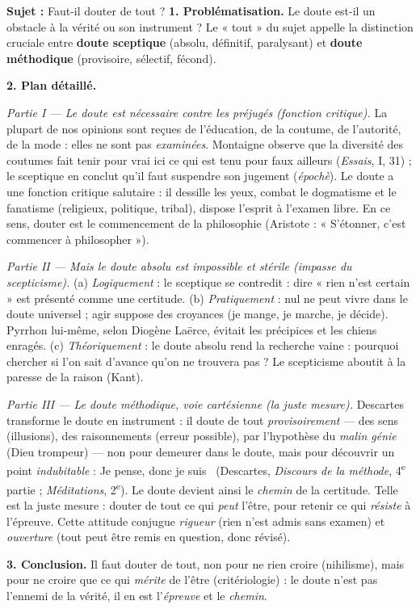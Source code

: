 \documentclass[11pt]{article}
\begin{document}
\begin{exoresolu}
\textbf{Sujet :} Faut-il douter de tout ?
\tcblower
\textbf{1. Problématisation.} Le doute est-il un obstacle à la vérité ou son instrument ? Le « tout » du sujet appelle la distinction cruciale entre \textbf{doute sceptique} (absolu, définitif, paralysant) et \textbf{doute méthodique} (provisoire, sélectif, fécond).

\textbf{2. Plan détaillé.}

\emph{Partie I — Le doute est nécessaire contre les préjugés (fonction critique).} La plupart de nos opinions sont reçues de l'éducation, de la coutume, de l'autorité, de la mode : elles ne sont pas \emph{examinées}. Montaigne observe que la diversité des coutumes fait tenir pour vrai ici ce qui est tenu pour faux ailleurs (\emph{Essais}, I, 31) ; le sceptique en conclut qu'il faut suspendre son jugement (\emph{épochè}). Le doute a une fonction critique salutaire : il dessille les yeux, combat le dogmatisme et le fanatisme (religieux, politique, tribal), dispose l'esprit à l'examen libre. En ce sens, douter est le commencement de la philosophie (Aristote : « S'étonner, c'est commencer à philosopher »).

\emph{Partie II — Mais le doute absolu est impossible et stérile (impasse du scepticisme).} (a) \emph{Logiquement} : le sceptique se contredit : dire « rien n'est certain » est présenté comme une certitude. (b) \emph{Pratiquement} : nul ne peut vivre dans le doute universel ; agir suppose des croyances (je mange, je marche, je décide). Pyrrhon lui-même, selon Diogène Laërce, évitait les précipices et les chiens enragés. (c) \emph{Théoriquement} : le doute absolu rend la recherche vaine : pourquoi chercher si l'on sait d'avance qu'on ne trouvera pas ? Le scepticisme aboutit à la paresse de la raison (Kant).

\emph{Partie III — Le doute méthodique, voie cartésienne (la juste mesure).} Descartes transforme le doute en instrument : il doute de tout \emph{provisoirement} — des sens (illusions), des raisonnements (erreur possible), par l'hypothèse du \emph{malin génie} (Dieu trompeur) — non pour demeurer dans le doute, mais pour découvrir un point \emph{indubitable} : \guillemotleft Je pense, donc je suis \guillemotright\ (Descartes, \emph{Discours de la méthode}, 4\textsuperscript{e} partie ; \emph{Méditations}, 2\textsuperscript{e}). Le doute devient ainsi le \emph{chemin} de la certitude. Telle est la juste mesure : douter de tout ce qui \emph{peut} l'être, pour retenir ce qui \emph{résiste} à l'épreuve. Cette attitude conjugue \emph{rigueur} (rien n'est admis sans examen) et \emph{ouverture} (tout peut être remis en question, donc révisé).

\textbf{3. Conclusion.} Il faut douter de tout, non pour ne rien croire (nihilisme), mais pour ne croire que ce qui \emph{mérite} de l'être (critériologie) : le doute n'est pas l'ennemi de la vérité, il en est l'\emph{épreuve} et le \emph{chemin}.
\end{exoresolu}
\end{document}
